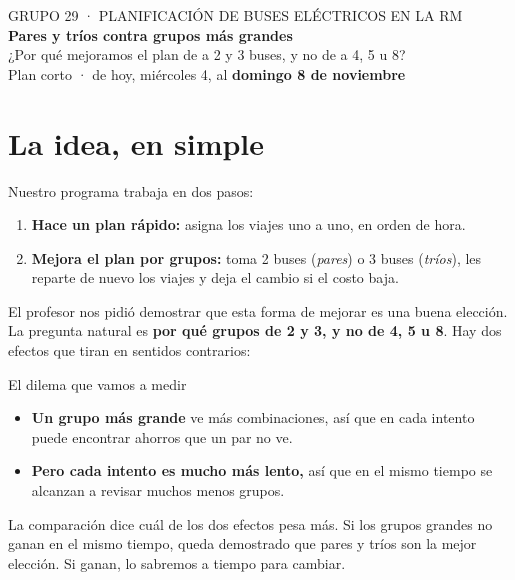 \documentclass[11pt,a4paper]{article}
\begin{document}
\begin{center}
  {\color{gris}\small GRUPO 29 · PLANIFICACIÓN DE BUSES ELÉCTRICOS EN LA RM}\\[0.4em]
  {\LARGE\bfseries\color{azul} Pares y tríos contra grupos más grandes}\\[0.3em]
  {\large ¿Por qué mejoramos el plan de a 2 y 3 buses, y no de a 4, 5 u 8?}\\[0.6em]
  {\color{gris} Plan corto · de hoy, miércoles 4, al \textbf{domingo 8 de noviembre}}
\end{center}

\vspace{0.5em}

\section{La idea, en simple}

Nuestro programa trabaja en dos pasos:
\begin{enumerate}[leftmargin=1.6em, itemsep=0.2em]
  \item \textbf{Hace un plan rápido:} asigna los viajes uno a uno, en orden de hora.
  \item \textbf{Mejora el plan por grupos:} toma 2 buses (\emph{pares}) o 3 buses (\emph{tríos}), les reparte de nuevo los viajes y deja el cambio si el costo baja.
\end{enumerate}

El profesor nos pidió demostrar que esta forma de mejorar es una buena elección. La pregunta natural es \textbf{por qué grupos de 2 y 3, y no de 4, 5 u 8}. Hay dos efectos que tiran en sentidos contrarios:

\begin{idea}{El dilema que vamos a medir}
\begin{itemize}[leftmargin=1.2em, itemsep=0.2em]
  \item \textbf{Un grupo más grande} ve más combinaciones, así que en cada intento puede encontrar ahorros que un par no ve.
  \item \textbf{Pero cada intento es mucho más lento,} así que en el mismo tiempo se alcanzan a revisar muchos menos grupos.
\end{itemize}
La comparación dice cuál de los dos efectos pesa más. Si los grupos grandes no ganan en el mismo tiempo, queda demostrado que pares y tríos son la mejor elección. Si ganan, lo sabremos a tiempo para cambiar.
\end{idea}
\end{document}
